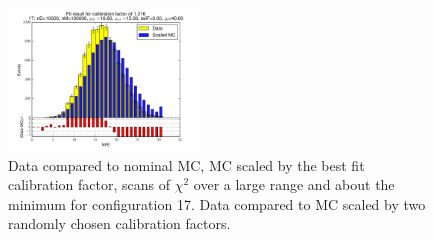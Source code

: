 \begin{figure}[htbp]
\begin{center}
\includegraphics[width=0.45\textwidth]{../FIGURES/17/FIG_Fit_result_for_calibration_factor_of_1_216.pdf} 
\caption{Data compared to nominal MC, MC scaled by the best fit calibration factor, scans of $\chi^2$ over a large range and about the minimum for configuration 17. Data compared to MC scaled by two randomly chosen calibration factors.} 
\label{tab:best_17} 
\end{center} \end{figure} 

